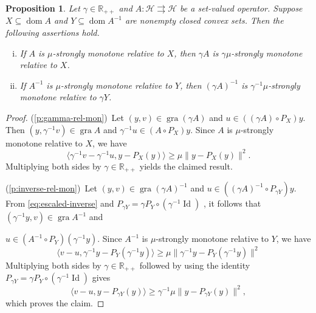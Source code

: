 \documentclass[a4paper,12pt]{article}
\newtheorem{proposition}[theorem]{Proposition}
\DeclareMathOperator{\Id}{Id}
\DeclareMathOperator{\gra}{gra}
\DeclareMathOperator{\dom}{dom}
\newcommand{\setto}{\rightrightarrows}
\begin{document}
\begin{proposition} \label{p:rel-to-a-set} Let $\gamma \in \mathbb{R}_{++}$ and $A:\mathcal{H}\setto\mathcal{H}$ be a set-valued operator. Suppose $X\subseteq\dom A$ and $Y\subseteq\dom A^{-1}$ are nonempty closed convex sets. Then the following assertions hold.
    \begin{enumerate}[(i)]
        \item \label{p:gamma-rel-mon} If $A$ is $\mu$-strongly monotone relative to  $X$, then $\gamma A$ is $\gamma\mu$-strongly monotone relative to  $X$.
        \item \label{p:inverse-rel-mon}If $A^{-1}$ is $\mu$-strongly monotone relative to $Y$, then $(\gamma A)^{-1}$ is $\gamma^{-1}\mu$-strongly monotone relative to  $\gamma Y$.
    \end{enumerate}
\end{proposition}


\begin{proof}
(\ref{p:gamma-rel-mon})~Let $(y,v)\in\gra(\gamma A)$ and $u \in ((\gamma A) \circ P_X)y$. Then $(y,\gamma^{-1}v)\in\gra A$ and $\gamma^{-1} u \in (A \circ P_X)y$. Since $A$ is $\mu$-strongly monotone relative to $X$, we have
\begin{equation*}
            \langle \gamma^{-1}v - \gamma^{-1}u, y - P_X(y) \rangle \ge \mu \|y - P_X(y)\|^2.
        \end{equation*}
        Multiplying both sides by $\gamma \in \mathbb{R}_{++}$ yields the claimed result.

(\ref{p:inverse-rel-mon})~Let $(y,v)\in\gra(\gamma A)^{-1}$ and $u \in ((\gamma A)^{-1} \circ P_{\gamma Y})y$. From \eqref{eq:escaled-inverse} and $P_{\gamma Y} = \gamma P_Y \circ (\gamma^{-1} \Id)$ \cite[Proposition~29.1]{bauschke2017convex}, it follows that $(\gamma^{-1}y,v)\in\gra A^{-1}$ and

$u\in (A^{-1}\circ P_Y)(\gamma^{-1}y)$. Since $A^{-1}$ is $\mu$-strongly monotone relative to $Y$, we have 
\begin{equation*}
            \langle v - u, \gamma^{-1}y - P_Y(\gamma^{-1}y) \rangle \ge \mu \|\gamma^{-1}y - P_Y(\gamma^{-1}y)\|^2
\end{equation*}
Multiplying both sides by $\gamma \in \mathbb{R}_{++}$ followed by using the identity $P_{\gamma Y} = \gamma P_Y \circ (\gamma^{-1} \Id)$ gives
\begin{equation*}
            \langle v - u, y - P_{\gamma Y}(y) \rangle \ge  \gamma^{-1}\mu \|y - P_{\gamma Y}(y)\|^2,
        \end{equation*}
which proves the claim.
\end{proof}
\end{document}
